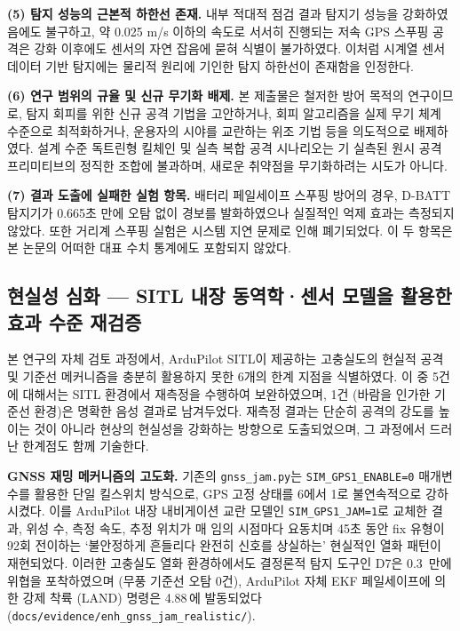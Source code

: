 \textbf{(5) 탐지 성능의 근본적 하한선 존재.} 내부 적대적 점검 결과 탐지기 성능을 강화하였음에도 불구하고, 약 0.025 m/s 이하의 속도로 서서히 진행되는 저속 GPS 스푸핑 공격은 강화 이후에도 센서의 자연 잡음에 묻혀 식별이 불가하였다. 이처럼 시계열 센서 데이터 기반 탐지에는 물리적 원리에 기인한 탐지 하한선이 존재함을 인정한다.

\textbf{(6) 연구 범위의 규율 및 신규 무기화 배제.} 본 제출물은 철저한 방어 목적의 연구이므로, 탐지 회피를 위한 신규 공격 기법을 고안하거나, 회피 알고리즘을 실제 무기 체계 수준으로 최적화하거나, 운용자의 시야를 교란하는 위조 기법 등을 의도적으로 배제하였다. 설계 수준 독트린형 킬체인 및 실측 복합 공격 시나리오는 기 실측된 원시 공격 프리미티브의 정직한 조합에 불과하며, 새로운 취약점을 무기화하려는 시도가 아니다.

\textbf{(7) 결과 도출에 실패한 실험 항목.} 배터리 페일세이프 스푸핑 방어의 경우, D-BATT 탐지기가 0.665초 만에 오탐 없이 경보를 발화하였으나 실질적인 억제 효과는 측정되지 않았다. 또한 거리계 스푸핑 실험은 시스템 지연 문제로 인해 폐기되었다. 이 두 항목은 본 논문의 어떠한 대표 수치 통계에도 포함되지 않았다.

\subsection{현실성 심화 --- SITL 내장 동역학·센서 모델을 활용한 효과 수준 재검증}

본 연구의 자체 검토 과정에서, ArduPilot SITL이 제공하는 고충실도의 현실적 공격 및 기준선 메커니즘을 충분히 활용하지 못한 6개의 한계 지점을 식별하였다. 이 중 5건에 대해서는 SITL 환경에서 재측정을 수행하여 보완하였으며, 1건 (바람을 인가한 기준선 환경)은 명확한 음성 결과로 남겨두었다. 재측정 결과는 단순히 공격의 강도를 높이는 것이 아니라 현상의 현실성을 강화하는 방향으로 도출되었으며, 그 과정에서 드러난 한계점도 함께 기술한다.

\textbf{GNSS 재밍 메커니즘의 고도화.} 기존의 \texttt{gnss\_jam.py}는 \texttt{SIM\_GPS1\_ENABLE=0} 매개변수를 활용한 단일 킬스위치 방식으로, GPS 고정 상태를 6에서 1로 불연속적으로 강하시켰다. 이를 ArduPilot 내장 내비게이션 교란 모델인 \texttt{SIM\_GPS1\_JAM=1}로 교체한 결과, 위성 수, 측정 속도, 추정 위치가 매 임의 시점마다 요동치며 45초 동안 fix 유형이 92회 전이하는 `불안정하게 흔들리다 완전히 신호를 상실하는' 현실적인 열화 패턴이 재현되었다. 이러한 고충실도 열화 환경하에서도 결정론적 탐지 도구인 D7은 0.3\, 만에 위협을 포착하였으며 (무풍 기준선 오탐 0건), ArduPilot 자체 EKF 페일세이프에 의한 강제 착륙 (LAND) 명령은 4.88\,에 발동되었다 (\texttt{docs/evidence/enh\_gnss\_jam\_realistic/}).

